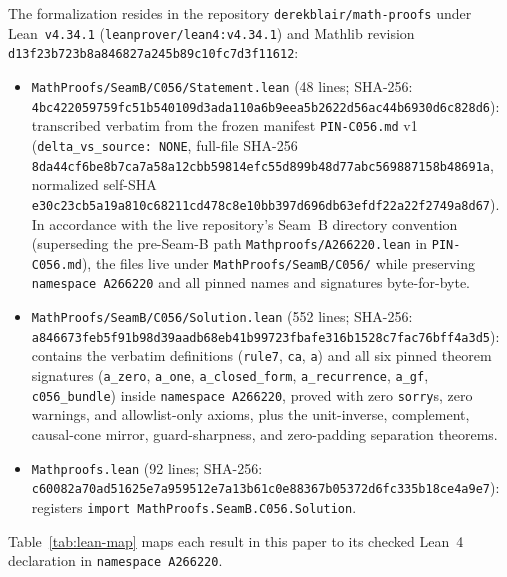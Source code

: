 \documentclass[11pt]{article}
\theoremstyle{definition}
\begin{document}
The formalization resides in the repository \texttt{derekblair/math-proofs} under Lean~\texttt{v4.34.1} (\nolinkurl{leanprover/lean4:v4.34.1}) and Mathlib revision {\small\nolinkurl{d13f23b723b8a846827a245b89c10fc7d3f11612}}:
\begin{itemize}
\item \nolinkurl{MathProofs/SeamB/C056/Statement.lean} (48 lines; SHA-256:\\
{\small\nolinkurl{4bc422059759fc51b540109d3ada110a6b9eea5b2622d56ac44b6930d6c828d6}}):\\
transcribed verbatim from the frozen manifest \texttt{PIN-C056.md} v1 (\texttt{delta\_vs\_source: NONE}, full-file SHA-256 {\small\nolinkurl{8da44cf6be8b7ca7a58a12cbb59814efc55d899b48d77abc569887158b48691a}}, normalized self-SHA {\small\nolinkurl{e30c23cb5a19a810c68211cd478c8e10bb397d696db63efdf22a22f2749a8d67}}). In accordance with the live repository's Seam~B directory convention (superseding the pre-Seam-B path \texttt{Mathproofs/A266220.lean} in \texttt{PIN-C056.md}), the files live under \texttt{MathProofs/SeamB/C056/} while preserving \texttt{namespace A266220} and all pinned names and signatures byte-for-byte.
\item \nolinkurl{MathProofs/SeamB/C056/Solution.lean} (552 lines; SHA-256:\\
{\small\nolinkurl{a846673feb5f91b98d39aadb68eb41b99723fbafe316b1528c7fac76bff4a3d5}}):\\
contains the verbatim definitions (\texttt{rule7}, \texttt{ca}, \texttt{a}) and all six pinned theorem signatures (\texttt{a\_zero}, \texttt{a\_one}, \texttt{a\_closed\_form}, \texttt{a\_recurrence}, \texttt{a\_gf}, \texttt{c056\_bundle}) inside \texttt{namespace A266220}, proved with zero \texttt{sorry}s, zero warnings, and allowlist-only axioms, plus the unit-inverse, complement, causal-cone mirror, guard-sharpness, and zero-padding separation theorems.
\item \nolinkurl{Mathproofs.lean} (92 lines; SHA-256:\\
{\small\nolinkurl{c60082a70ad51625e7a959512e7a13b61c0e88367b05372d6fc335b18ce4a9e7}}):\\
registers \texttt{import MathProofs.SeamB.C056.Solution}.
\end{itemize}

Table~\ref{tab:lean-map} maps each result in this paper to its checked Lean~4 declaration in \texttt{namespace A266220}.
\end{document}
